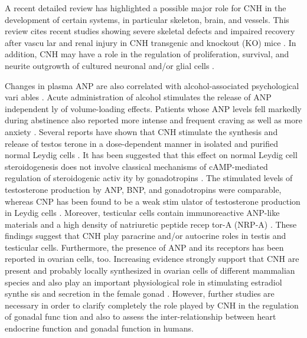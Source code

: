 \documentclass[14pt,a4paper,onecolumn]{extarticle}
\begin{document}
A recent detailed review \citep{107} has highlighted a possible major role for CNH in the development of certain systems, in particular skeleton, brain, and vessels. This review cites recent studies showing severe skeletal defects and impaired recovery after vascu lar and renal injury in CNH transgenic and knockout (KO) mice \citep{108}. In addition, CNH may have a role in the regulation of proliferation, survival, and neurite outgrowth of cultured neuronal and/or glial cells \citep{108}.

Changes in plasma ANP are also correlated with alcohol-associated psychological vari ables \citep{108}. Acute administration of alcohol stimulates the release of ANP independent ly of volume-loading effects. Patients whose ANP levels fell markedly during abstinence also reported more intense and frequent craving as well as more anxiety \citep{108}.  Several reports have shown that CNH stimulate the synthesis and release of testos terone in a dose-dependent manner in isolated and purified normal Leydig cells \citep{109 112}. It has been suggested that this effect on normal Leydig cell steroidogenesis does not involve classical mechanisms of cAMP-mediated regulation of steroidogenic activ ity by gonadotropins \citep{112}. The stimulated levels of testosterone production by ANP, BNP, and gonadotropins were comparable, whereas CNP has been found to be a weak stim ulator of testosterone production in Leydig cells \citep{112}. Moreover, testicular cells contain immunoreactive ANP-like materials and a high density of natriuretic peptide recep tor-A (NRP-A) \citep{112}. These findings suggest that CNH play paracrine and/or autocrine roles in testis and testicular cells. Furthermore, the presence of ANP and its receptors has been reported in ovarian cells, too. Increasing evidence strongly support that CNH are present and probably locally synthesized in ovarian cells of different mammalian species and also play an important physiological role in stimulating estradiol synthe sis and secretion in the female gonad \citep{112-115}. However, further studies are necessary in order to clarify completely the role played by CNH in the regulation of gonadal func tion and also to assess the inter-relationship between heart endocrine function and gonadal function in humans.
\end{document}
